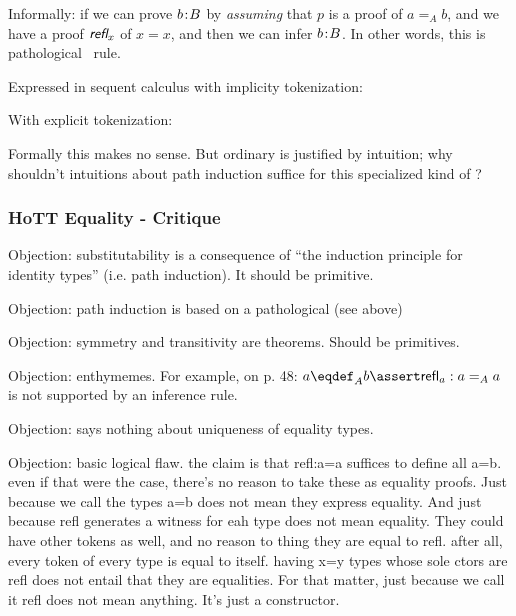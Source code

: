 \documentclass{article}
\begin{document}
Informally: if we can prove \(\tj{b}{B}\) by \textit{assuming} that
\(p\) is a proof of \(a=_Ab\), and we have a proof \(\refl_x\) of
\(x=x\), and then we can infer \(\tj{b}{B}\). In other words, this is
pathological \modus\ rule.

Expressed in sequent calculus with implicity tokenization:

\begin{prooftree}
\end{prooftree}

With explicit tokenization:

\begin{prooftree}
\end{prooftree}

Formally this makes no sense. But ordinary \modus{} is justified by
intuition; why shouldn't intuitions about path induction suffice for
this specialized kind of \modus?

\subsubsection{HoTT Equality - Critique}

Objection: substitutability is a consequence of ``the induction principle for identity types'' (i.e. path induction).  It should be primitive.

Objection: path induction is based on a pathological \modus (see above)

Objection: symmetry and transitivity are theorems. Should be primitives.

Objection: enthymemes. For example, on p. 48: \(a\defeq_A
b\linfer\textsf{refl}_a:a=_A a\) is not supported by an inference rule.

Objection: says nothing about uniqueness of equality types.

Objection: basic logical flaw. the claim is that refl:a=a suffices to
define all a=b. even if that were the case, there's no reason to take
these as equality proofs. Just because we call the types a=b does not
mean they express equality. And just because refl generates a witness
for eah type does not mean equality. They could have other tokens as
well, and no reason to thing they are equal to refl. after all, every
token of every type is equal to itself. having x=y types whose sole
ctors are refl does not entail that they are equalities. For that
matter, just because we call it refl does not mean anything. It's just
a constructor.
\end{document}
